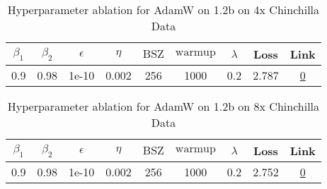 \begin{table}[H]
\centering
\caption{Hyperparameter ablation for AdamW on 1.2b on 4x Chinchilla Data}
\label{tab:ablation_adamw_1.2b_4}
\begin{tabular}{ccccccccc}
\toprule
$\beta_1$ & $\beta_2$ & $\epsilon$ & $\eta$ & $\mathrm{BSZ}$ & $\mathrm{warmup}$ & $\lambda$ & Loss & Link \\
\midrule
0.9 & 0.98 & 1e-10 & 0.002 & 256 & 1000 & 0.2 & 2.787 & \href{https://wandb.ai/stanford-mercury/optimizer-scaling/runs/sweep-1.2b-96B-adamw71c224lr0.002-wd0.2-minlr0.0-warmup1000-b10.-66682a}{0} \\
\midrule
\bottomrule
\end{tabular}
\end{table}

\begin{table}[H]
\centering
\caption{Hyperparameter ablation for AdamW on 1.2b on 8x Chinchilla Data}
\label{tab:ablation_adamw_1.2b_8}
\begin{tabular}{ccccccccc}
\toprule
$\beta_1$ & $\beta_2$ & $\epsilon$ & $\eta$ & $\mathrm{BSZ}$ & $\mathrm{warmup}$ & $\lambda$ & Loss & Link \\
\midrule
0.9 & 0.98 & 1e-10 & 0.002 & 256 & 1000 & 0.2 & 2.752 & \href{https://wandb.ai/stanford-mercury/optimizer-scaling/runs/sweep-1.2b-193B-adamw1eeba1lr0.002-wd0.2-minlr0.0-warmup1000-b10-44a428}{0} \\
\midrule
\bottomrule
\end{tabular}
\end{table}

